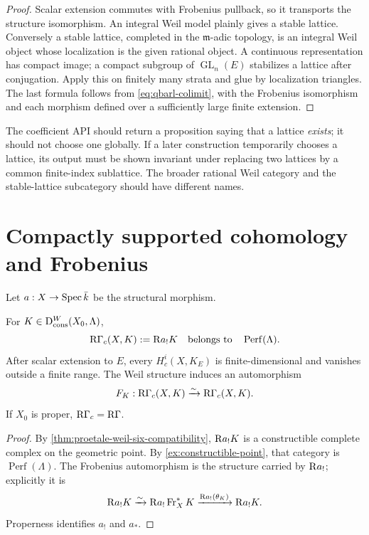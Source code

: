 \begin{proof}
Scalar extension commutes with Frobenius pullback, so it transports the
structure isomorphism.  An integral Weil model plainly gives a stable
lattice.  Conversely a stable lattice, completed in the
\(\mathfrak m\)-adic topology, is an integral Weil object whose
localization is the given rational object.  A continuous representation has
compact image; a compact subgroup of \(\operatorname{GL}_n(E)\) stabilizes a
lattice after conjugation.  Apply this on finitely many strata and glue by
localization triangles.  The last formula follows from
\cref{eq:qbarl-colimit}, with the Frobenius isomorphism and each morphism
defined over a sufficiently large finite extension.
\end{proof}

\begin{formalization}
The coefficient API should return a proposition saying that a lattice
\emph{exists}; it should not choose one globally.  If a later construction
temporarily chooses a lattice, its output must be shown invariant under
replacing two lattices by a common finite-index sublattice.  The broader
rational Weil category and the stable-lattice subcategory should have
different names.
\end{formalization}

\section{Compactly supported cohomology and Frobenius}

Let \(a:X\to\operatorname{Spec} \bar k\) be the structural morphism.

\begin{theorem}
\label{thm:proetale-weil-perfectness}
\label{thm:adic-perfectness}
For \(K\in\mathrm D_{\mathrm{cons}}^W(X_0,\Lambda)\),
\begin{equation}
\label{eq:perfect-compact-cohomology}
 \mathrm R\Gamma_c(X,K):=\mathrm R a_!K
   \quad\text{belongs to}\quad \operatorname{Perf}(\Lambda).
\end{equation}
After scalar extension to \(E\), every
\(H_c^i(X,K_E)\) is finite-dimensional and vanishes outside a finite range.
The Weil structure induces an automorphism
\[
  F_K:\mathrm R\Gamma_c(X,K)\xrightarrow{\sim}\mathrm R\Gamma_c(X,K).
\]
If \(X_0\) is proper, \(\mathrm R\Gamma_c=\mathrm R\Gamma\).
\end{theorem}

\begin{proof}
By \cref{thm:proetale-weil-six-compatibility}, \(\mathrm R a_!K\) is a
constructible complete complex on the geometric point.  By
\cref{ex:constructible-point}, that category is \(\operatorname{Perf}(\Lambda)\).  The
Frobenius automorphism is the structure carried by \(\mathrm R a_!\); explicitly it
is
\[
 \mathrm R a_!K
   \xrightarrow{\sim}
 \mathrm R a_!\operatorname{Fr}_X^*K
   \xrightarrow{\mathrm R a_!(\theta_K)}
 \mathrm R a_!K.
\]
Properness identifies \(a_!\) and \(a_*\).
\end{proof}


